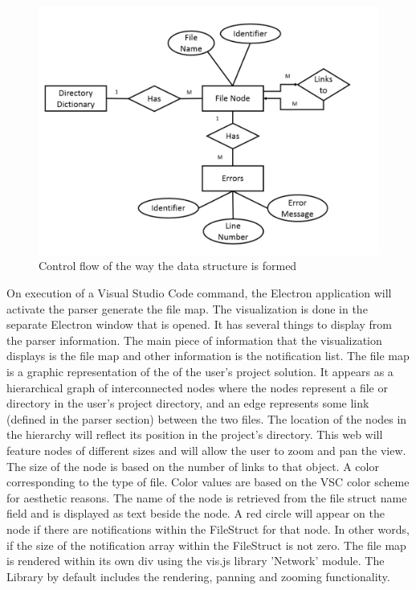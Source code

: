 \documentclass[letterpaper,10pt,titlepage,draftclsnofoot,onecolumn,onesided] {IEEEtran}
\begin{document}
\begin{figure}[H]
	\centering
	\includegraphics[width=.75\textwidth]{InformationERDEPS-eps-converted-to}
	\caption{Control flow of the way the data structure is formed}
\end{figure}

On execution of a Visual Studio Code command, the Electron application will activate the parser generate the file map. 
The visualization is done in the separate Electron window that is opened.
It has several things to display from the parser information. 
The main piece of information that the visualization displays is the file map and other information is the notification list. 
The file map is a graphic representation of the of the user's project solution. 
It appears as a hierarchical graph of interconnected nodes where the nodes represent a file or directory in the user's project directory, and an edge represents some link (defined in the parser section) between the two files. 
The location of the nodes in the hierarchy will reflect its position in the project's directory. 
This web will feature nodes of different sizes and will allow the user to zoom and pan the view. 
The size of the node is based on the number of links to that object.
A color corresponding to the type of file. 
Color values are based on the VSC color scheme for aesthetic reasons.
The name of the node is retrieved from the file struct name field and is displayed as text beside the node. 
A red circle will appear on the node if there are notifications within the FileStruct for that node. 
In other words, if the size of the notification array within the FileStruct is not zero. 
The file map is rendered within its own div using the vis.js library 'Network' module. 
The Library by default includes the rendering, panning and zooming functionality. \\
\end{document}
